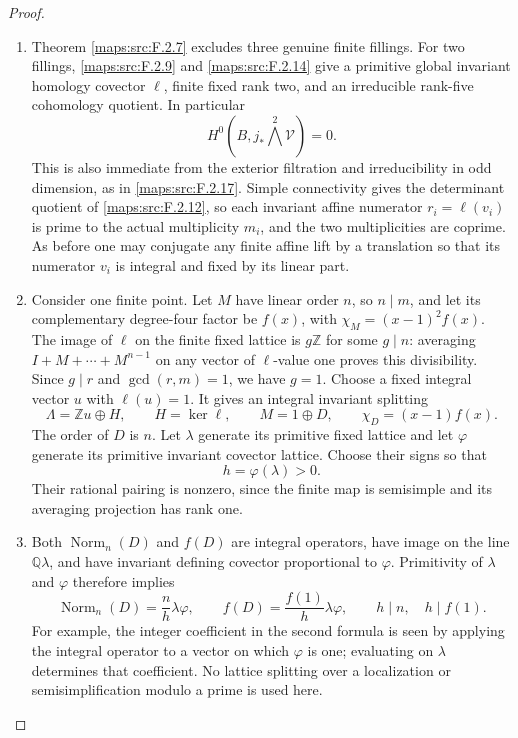 \documentclass[11pt,a4paper]{article}
\theoremstyle{definition}
\begin{document}
\begin{proof}
\begin{enumerate}[label=\arabic*.]
\item Theorem \ref{maps:src:F.2.7} excludes three genuine finite fillings.
For two fillings, \ref{maps:src:F.2.9} and \ref{maps:src:F.2.14} give a primitive global
invariant homology covector $\ell$, finite fixed rank two,
and an irreducible rank-five cohomology quotient.
In particular
\[
 H^0(B,j_*\bigwedge^2\mathcal V)=0.
 \tag{F.S2}\label{maps:eq:F.S2}
\]
This is also immediate from the exterior filtration and
irreducibility in odd dimension, as in \ref{maps:src:F.2.17}.
Simple connectivity gives the determinant quotient of
\ref{maps:src:F.2.12}, so each invariant affine numerator $r_i=\ell(v_i)$
is prime to the actual multiplicity $m_i$, and the two
multiplicities are coprime.
As before one may conjugate any finite affine lift by a
translation so that its numerator $v_i$ is integral and
fixed by its linear part.

\item Consider one finite point.  Let $M$ have linear order $n$,
so $n\mid m$, and let its complementary degree-four factor
be $f(x)$, with
$\chi_M=(x-1)^2f(x)$.
The image of $\ell$ on the finite fixed lattice is $g\mathbb Z$
for some $g\mid n$: averaging $I+M+\cdots+M^{n-1}$ on
any vector of $\ell$-value one proves this divisibility.
Since $g\mid r$ and $\gcd(r,m)=1$, we have $g=1$.
Choose a fixed integral vector $u$ with $\ell(u)=1$.
It gives an integral invariant splitting
\[
 \Lambda=\mathbb Zu\oplus H,
 \qquad H=\ker\ell,\qquad M=1\oplus D,
 \qquad\chi_D=(x-1)f(x).
 \tag{F.S3}\label{maps:eq:F.S3}
\]
The order of $D$ is $n$.
Let $\lambda$ generate its primitive fixed lattice and
let $\varphi$ generate its primitive invariant covector
lattice.  Choose their signs so that
\[
 h=\varphi(\lambda)>0.
 \tag{F.S4}\label{maps:eq:F.S4}
\]
Their rational pairing is nonzero, since the finite map
is semisimple and its averaging projection has rank one.

\item Both $\operatorname{Norm}_n(D)$ and $f(D)$ are integral
operators, have image on the line $\mathbb Q\lambda$,
and have invariant defining covector proportional to
$\varphi$.  Primitivity of $\lambda$ and $\varphi$
therefore implies
\[
 \operatorname{Norm}_n(D)=\frac n h\lambda\varphi,
 \qquad
 f(D)=\frac{f(1)}h\lambda\varphi,
 \qquad h\mid n,\quad h\mid f(1).
 \tag{F.S5}\label{maps:eq:F.S5}
\]
For example, the integer coefficient in the second formula
is seen by applying the integral operator to a vector on
which $\varphi$ is one; evaluating on $\lambda$ determines
that coefficient.  No lattice splitting over a localization
or semisimplification modulo a prime is used here.


\end{enumerate}
\end{proof}
\end{document}
